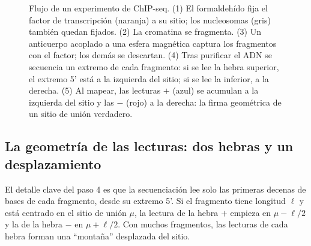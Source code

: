 \begin{figure}[t]
\caption[Flujo de un experimento de ChIP-seq]{Flujo de un experimento de ChIP-seq. (1) El formaldehído fija el factor de transcripción (naranja) a su sitio; los nucleosomas (gris) también quedan fijados. (2) La cromatina se fragmenta. (3) Un anticuerpo acoplado a una esfera magnética captura los fragmentos con el factor; los demás se descartan. (4) Tras purificar el ADN se secuencia un extremo de cada fragmento: si se lee la hebra superior, el extremo 5' está a la izquierda del sitio; si se lee la inferior, a la derecha. (5) Al mapear, las lecturas $+$ (azul) se acumulan a la izquierda del sitio y las $-$ (rojo) a la derecha: la firma geométrica de un sitio de unión verdadero.}
\label{fig:13-chip}
\end{figure}

\subsection{La geometría de las lecturas: dos hebras y un desplazamiento}

El detalle clave del paso 4 es que la secuenciación lee solo las primeras decenas de bases de cada fragmento, desde su extremo 5'. Si el fragmento tiene longitud $\ell$ y está centrado en el sitio de unión $\mu$, la lectura de la hebra $+$ empieza en $\mu-\ell/2$ y la de la hebra $-$ en $\mu+\ell/2$. Con muchos fragmentos, las lecturas de cada hebra forman una ``montaña'' desplazada del sitio.

